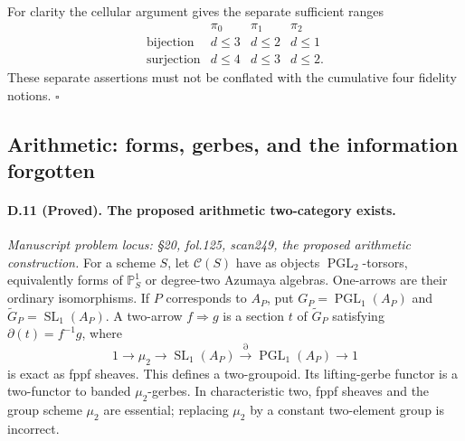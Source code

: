 For clarity the cellular argument gives the separate sufficient ranges
\[
\begin{array}{c|ccc}
 &\pi_0&\pi_1&\pi_2\\\hline
\text{bijection}&d\leq3&d\leq2&d\leq1\\
\text{surjection}&d\leq4&d\leq3&d\leq2.
\end{array}
\]
These separate assertions must not be conflated with the cumulative four fidelity notions. \hfill$\square$

\subsection{Arithmetic: forms, gerbes, and the information forgotten}

\paragraph{D.11 (Proved). The proposed arithmetic two-category exists.}
\emph{Manuscript problem locus: \S20, fol.125, scan249, the proposed arithmetic construction.}
For a scheme $S$, let $\mathcal C(S)$ have as objects $\operatorname{PGL}_2$-torsors, equivalently forms of $\mathbb P^1_S$ or degree-two Azumaya algebras. One-arrows are their ordinary isomorphisms. If $P$ corresponds to $A_P$, put $G_P=\operatorname{PGL}_1(A_P)$ and $\widetilde G_P=\operatorname{SL}_1(A_P)$. A two-arrow $f\Rightarrow g$ is a section $t$ of $\widetilde G_P$ satisfying $\partial(t)=f^{-1}g$, where
\[
1\longrightarrow\mu_2\longrightarrow\operatorname{SL}_1(A_P)
\xrightarrow{\partial}\operatorname{PGL}_1(A_P)\longrightarrow1
\]
is exact as fppf sheaves. This defines a two-groupoid. Its lifting-gerbe functor is a two-functor to banded $\mu_2$-gerbes. In characteristic two, fppf sheaves and the group scheme $\mu_2$ are essential; replacing $\mu_2$ by a constant two-element group is incorrect.

